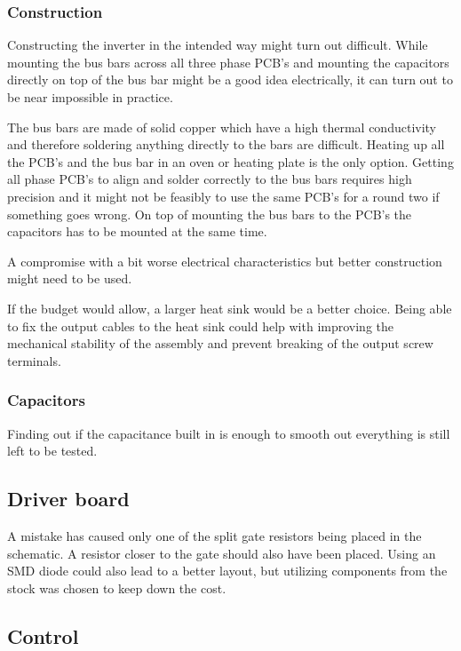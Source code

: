\subsubsection{Construction}
Constructing the inverter in the intended way might turn out difficult. While mounting the bus bars across all three phase PCB's and mounting the capacitors directly on top of the bus bar might be a good idea electrically, it can turn out to be near impossible in practice.

The bus bars are made of solid copper which have a high thermal conductivity and therefore soldering anything directly to the bars are difficult. Heating up all the PCB's and the bus bar in an oven or heating plate is the only option. 
Getting all phase PCB's to align and solder correctly to the bus bars requires high precision and it might not be feasibly to use the same PCB's for a round two if something goes wrong.
On top of mounting the bus bars to the PCB's the capacitors has to be mounted at the same time. 

A compromise with a bit worse electrical characteristics but better construction might need to be used.

If the budget would allow, a larger heat sink would be a better choice. Being able to fix the output cables to the heat sink could help with improving the mechanical stability of the assembly and prevent breaking of the output screw terminals.

\subsubsection{Capacitors}
Finding out if the capacitance built in is enough to smooth out everything is still left to be tested.

\subsection{Driver board}
A mistake has caused only one of the split gate resistors being placed in the schematic. A resistor closer to the gate should also have been placed. Using an SMD diode could also lead to a better layout, but utilizing components from the stock was chosen to keep down the cost.

\subsection{Control}



